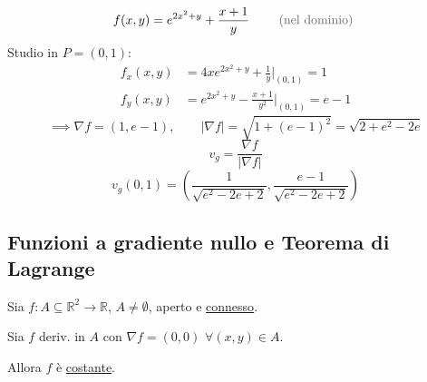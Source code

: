 \begin{esercizio}
\[
f(x, y) = e^{2x^2 + y} + \frac{x + 1}{y} \qquad \text{\pencilnote{(nel dominio)}}
\]
Studio in $P = (0, 1)$:
\begin{align*}
f_x(x, y) &= 4x e^{2x^2 + y} + \frac{1}{y} \Bigg|_{(0, 1)} = 1 \\
f_y(x, y) &= e^{2x^2 + y} - \frac{x + 1}{y^2} \Bigg|_{(0, 1)} = e - 1
\end{align*}
\[
\implies \nabla f = (1, e - 1), \qquad |\nabla f| = \sqrt{1 + (e - 1)^2} = \sqrt{2 + e^2 - 2e}
\]
\[
v_g = \frac{\nabla f}{|\nabla f|}
\]
\[
v_g(0, 1) = \left( \frac{1}{\sqrt{e^2 - 2e + 2}}, \frac{e - 1}{\sqrt{e^2 - 2e + 2}} \right)
\]
\end{esercizio}

\subsection{Funzioni a gradiente nullo e Teorema di Lagrange}

\begin{theorem}
Sia $f : A \subseteq \mathbb{R}^2 \to \mathbb{R}$, $A \neq \emptyset$, aperto e \underline{connesso}.

Sia $f$ deriv. in $A$ con $\nabla f = (0, 0)$ $\forall (x, y) \in A$.

Allora $f$ è \underline{costante}.
\end{theorem}


